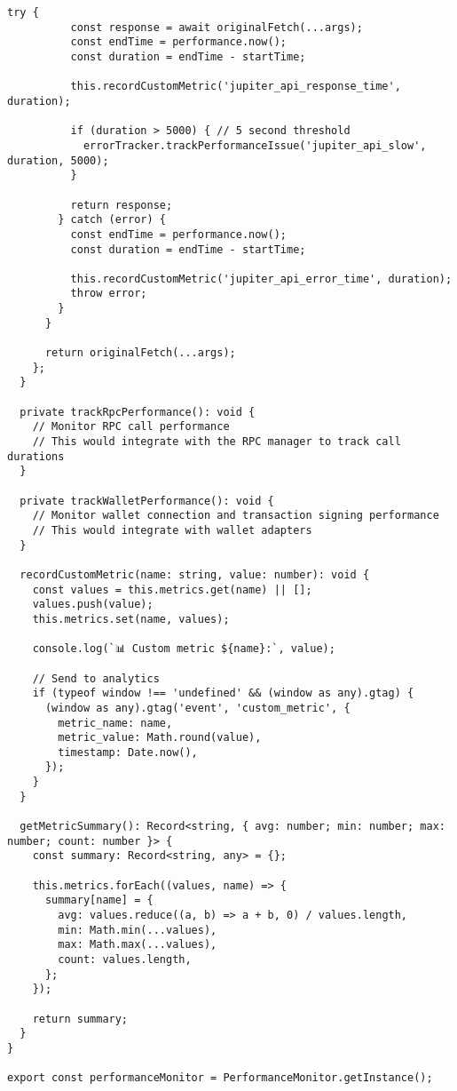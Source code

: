 \documentclass[11pt,a4paper]{article}
\begin{document}
\begin{lstlisting}[style=javascript, caption=Web Vitals Performance Monitoring]
        try {
          const response = await originalFetch(...args);
          const endTime = performance.now();
          const duration = endTime - startTime;
          
          this.recordCustomMetric('jupiter_api_response_time', duration);
          
          if (duration > 5000) { // 5 second threshold
            errorTracker.trackPerformanceIssue('jupiter_api_slow', duration, 5000);
          }
          
          return response;
        } catch (error) {
          const endTime = performance.now();
          const duration = endTime - startTime;
          
          this.recordCustomMetric('jupiter_api_error_time', duration);
          throw error;
        }
      }
      
      return originalFetch(...args);
    };
  }
  
  private trackRpcPerformance(): void {
    // Monitor RPC call performance
    // This would integrate with the RPC manager to track call durations
  }
  
  private trackWalletPerformance(): void {
    // Monitor wallet connection and transaction signing performance
    // This would integrate with wallet adapters
  }
  
  recordCustomMetric(name: string, value: number): void {
    const values = this.metrics.get(name) || [];
    values.push(value);
    this.metrics.set(name, values);
    
    console.log(`📊 Custom metric ${name}:`, value);
    
    // Send to analytics
    if (typeof window !== 'undefined' && (window as any).gtag) {
      (window as any).gtag('event', 'custom_metric', {
        metric_name: name,
        metric_value: Math.round(value),
        timestamp: Date.now(),
      });
    }
  }
  
  getMetricSummary(): Record<string, { avg: number; min: number; max: number; count: number }> {
    const summary: Record<string, any> = {};
    
    this.metrics.forEach((values, name) => {
      summary[name] = {
        avg: values.reduce((a, b) => a + b, 0) / values.length,
        min: Math.min(...values),
        max: Math.max(...values),
        count: values.length,
      };
    });
    
    return summary;
  }
}

export const performanceMonitor = PerformanceMonitor.getInstance();


\end{lstlisting}
\end{document}

